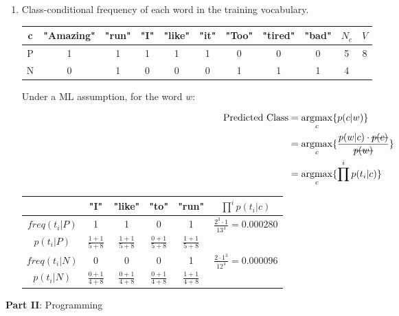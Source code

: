 \documentclass{article}
\DeclareMathOperator*{\argmax}{argmax}
\begin{document}
\begin{enumerate}[leftmargin=\labelsep]
\newpage

\raggedright
\item Class-conditional frequency of each word in the training vocabulary.

\begin{table}[H]
  \centering
  \begin{tabular}{ccccccccccc}
    c & "Amazing" & "run" & "I" & "like" & "it" & "Too" & "tired" & "bad" & $N_c$ & $V$ \\ \midrule
    P & 1 & 1 & 1 & 1 & 1 & 0 & 0 & 0 & 5 & \multirow{2}{*}{8} \\
    N & 0 & 1 & 0 & 0 & 0 & 1 & 1 & 1 & 4 \\
  \end{tabular}
\end{table}

Under a ML assumption, for the word $w$:

\begin{align*}
  \text{Predicted Class} &= \argmax_c \{ p(c|w) \} \\
  &= \argmax_c \{ \frac{p(w|c) \cdot \hbox{\sout{$p(c)$}}}{\hbox{\sout{$p(w)$}}} \} \\
  &= \argmax_c \{ \prod^ip(t_i|c) \}
\end{align*}


\begin{table}[H]
  \centering
  \begin{tabular}{ccccc|c}
     & "I" & "like" & "to" & "run" & $\prod^ip(t_i|c)$ \\ \toprule
    $freq(t_i | P)$ & 1 & 1 & 0 & 1 & \multirow{2}{*}{$\frac{2^3\cdot 1}{13^4}=0.000280$} \\
    $p(t_i|P)$      & $\frac{1+1}{5+8}$ & $\frac{1+1}{5+8}$ & $\frac{0+1}{5+8}$ & $\frac{1+1}{5+8}$ \\ \midrule
    $freq(t_i | N)$ & 0 & 0 & 0 & 1 & \multirow{2}{*}{$\frac{2\cdot 1^3}{12^4}=0.000096$} \\
    $p(t_i|N)$      & $\frac{0+1}{4+8}$ & $\frac{0+1}{4+8}$ & $\frac{0+1}{4+8}$ & $\frac{1+1}{4+8}$ \\
  \end{tabular}
\end{table}

\centering
{}
\end{enumerate}
\newpage
\large{\textbf{Part II}: Programming}\normalsize
\end{document}

